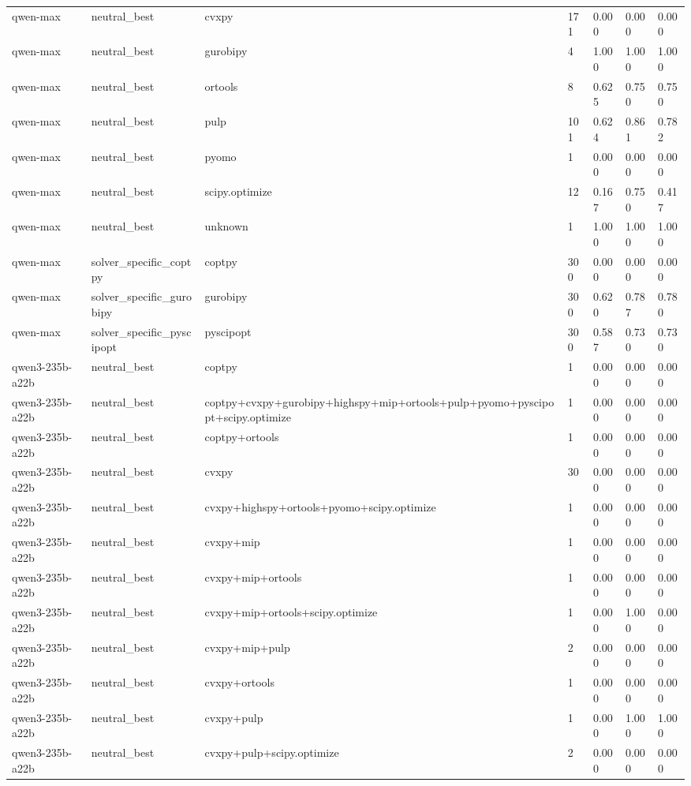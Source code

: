 \begin{table}[t]
\begin{tabular}{lllllll}
qwen-max & neutral\_best & cvxpy & 171 & 0.000 & 0.000 & 0.000 \\
qwen-max & neutral\_best & gurobipy & 4 & 1.000 & 1.000 & 1.000 \\
qwen-max & neutral\_best & ortools & 8 & 0.625 & 0.750 & 0.750 \\
qwen-max & neutral\_best & pulp & 101 & 0.624 & 0.861 & 0.782 \\
qwen-max & neutral\_best & pyomo & 1 & 0.000 & 0.000 & 0.000 \\
qwen-max & neutral\_best & scipy.optimize & 12 & 0.167 & 0.750 & 0.417 \\
qwen-max & neutral\_best & unknown & 1 & 1.000 & 1.000 & 1.000 \\
qwen-max & solver\_specific\_coptpy & coptpy & 300 & 0.000 & 0.000 & 0.000 \\
qwen-max & solver\_specific\_gurobipy & gurobipy & 300 & 0.620 & 0.787 & 0.780 \\
qwen-max & solver\_specific\_pyscipopt & pyscipopt & 300 & 0.587 & 0.730 & 0.730 \\
qwen3-235b-a22b & neutral\_best & coptpy & 1 & 0.000 & 0.000 & 0.000 \\
qwen3-235b-a22b & neutral\_best & coptpy+cvxpy+gurobipy+highspy+mip+ortools+pulp+pyomo+pyscipopt+scipy.optimize & 1 & 0.000 & 0.000 & 0.000 \\
qwen3-235b-a22b & neutral\_best & coptpy+ortools & 1 & 0.000 & 0.000 & 0.000 \\
qwen3-235b-a22b & neutral\_best & cvxpy & 30 & 0.000 & 0.000 & 0.000 \\
qwen3-235b-a22b & neutral\_best & cvxpy+highspy+ortools+pyomo+scipy.optimize & 1 & 0.000 & 0.000 & 0.000 \\
qwen3-235b-a22b & neutral\_best & cvxpy+mip & 1 & 0.000 & 0.000 & 0.000 \\
qwen3-235b-a22b & neutral\_best & cvxpy+mip+ortools & 1 & 0.000 & 0.000 & 0.000 \\
qwen3-235b-a22b & neutral\_best & cvxpy+mip+ortools+scipy.optimize & 1 & 0.000 & 1.000 & 0.000 \\
qwen3-235b-a22b & neutral\_best & cvxpy+mip+pulp & 2 & 0.000 & 0.000 & 0.000 \\
qwen3-235b-a22b & neutral\_best & cvxpy+ortools & 1 & 0.000 & 0.000 & 0.000 \\
qwen3-235b-a22b & neutral\_best & cvxpy+pulp & 1 & 0.000 & 1.000 & 1.000 \\
qwen3-235b-a22b & neutral\_best & cvxpy+pulp+scipy.optimize & 2 & 0.000 & 0.000 & 0.000 \\

\end{tabular}
\end{table}
